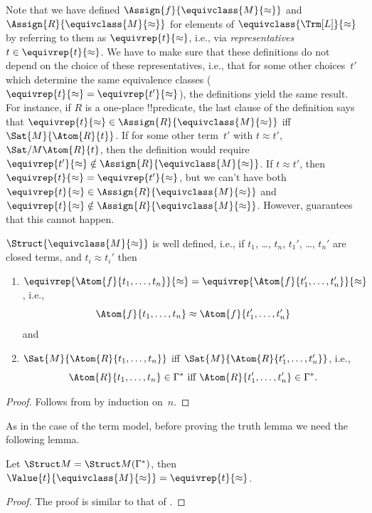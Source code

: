 \begin{explain}
Note that we have defined $\Assign{f}{\equivclass{M}{\approx}}$ and
$\Assign{R}{\equivclass{M}{\approx}}$ for elements of
$\equivclass{\Trm[L]}{\approx}$ by referring to them as
$\equivrep{t}{\approx}$, i.e., via \emph{representatives}~$t \in
\equivrep{t}{\approx}$.  We have to make sure that these definitions
do not depend on the choice of these representatives, i.e., that for
some other choices~$t'$ which determine the same equivalence classes
($\equivrep{t}{\approx} = \equivrep{t'}{\approx}$), the definitions
yield the same result. For instance, if $R$ is a one-place
!!{predicate}, the last clause of the definition says that
$\equivrep{t}{\approx} \in \Assign{R}{\equivclass{M}{\approx}}$ iff
$\Sat{M}{\Atom{R}{t}}$. If for some other term~$t'$ with $t \approx
t'$, $\Sat/{M}{\Atom{R}{t}}$, then the definition would require
$\equivrep{t'}{\approx} \notin \Assign{R}{\equivclass{M}{\approx}}$.
If $t \approx t'$, then $\equivrep{t}{\approx} =
\equivrep{t'}{\approx}$, but we can't have both $\equivrep{t}{\approx}
\in \Assign{R}{\equivclass{M}{\approx}}$ and $\equivrep{t}{\approx}
\notin \Assign{R}{\equivclass{M}{\approx}}$.  However,
 guarantees that this cannot happen.
\end{explain}

\begin{prop}
$\Struct{\equivclass{M}{\approx}}$ is well defined, i.e., if $t_1$,
  \dots, $t_n$, $t_1'$, \dots, $t_n'$ are closed terms,
  and $t_i \approx t_i'$ then
\begin{enumerate}
\item $\equivrep{\Atom{f}{t_1,\dots, t_n}}{\approx} =
    \equivrep{\Atom{f}{t_1',\dots, t_n'}}{\approx}$, i.e.,
  \[
  \Atom{f}{t_1,\dots, t_n} \approx \Atom{f}{t_1',\dots, t_n'}
  \]
  and
\item $\Sat{M}{\Atom{R}{t_1,\dots, t_n}}$ iff
  $\Sat{M}{\Atom{R}{t_1',\dots, t_n'}}$, i.e.,
  \[
    \Atom{R}{t_1,\dots, t_n} \in \Gamma^* \text{ iff }
    \Atom{R}{t_1',\dots, t_n'} \in \Gamma^*.
  \]
\end{enumerate}
\end{prop}

\begin{proof}
Follows from  by induction on~$n$.
\end{proof}

As in the case of the term model, before proving the truth lemma we need the
following lemma.

\begin{lem} 
 Let $\Struct M = \Struct M
 (\Gamma^*)$, then $\Value{t}{\equivclass{M}{\approx}} = \equivrep{t}
 {\approx}$.
\end{lem}
\begin{proof} 
The proof is similar to that of .
\end{proof}

